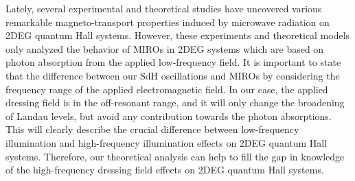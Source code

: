 \documentclass[
 reprint,
 amsmath,amssymb,
 aps,
 prb,
]{revtex4-2}
\begin{document}
{\color{Red}
Lately, several experimental \cite{zudov01,mani02,zudov03,mani04} and theoretical \cite{durst03,dmitriev03,dmitriev05,dmitriev09} studies have uncovered various remarkable
magneto-transport properties induced by microwave radiation on 2DEG quantum Hall systems. However, these experiments and theoretical models only analyzed the behavior of MIROs in 2DEG systems which are based on photon absorption from the applied low-frequency field.
It is important to state that the difference between our SdH oscillations and MIROs \cite{zudov01,mani02,zudov03,mani04} by considering the frequency range of the applied electromagnetic field. In our case, the applied dressing field is in the off-resonant range, and it will only change the broadening of Landau levels, but avoid any contribution towards the photon absorptions. This will clearly describe the crucial difference between low-frequency illumination and high-frequency illumination effects on 2DEG quantum Hall systems. Therefore, our theoretical analysis can help to fill the gap in knowledge of the high-frequency dressing field effects on 2DEG quantum Hall systems.
}
\end{document}
